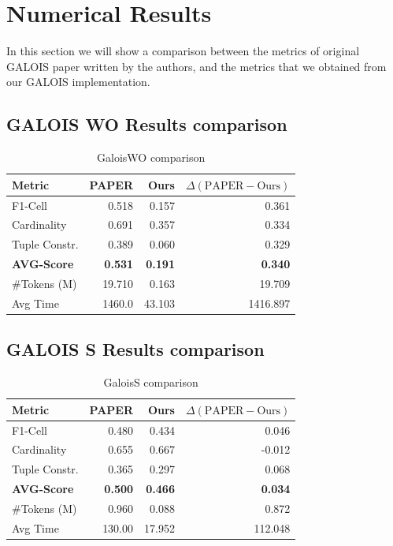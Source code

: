 \section{Numerical Results}
\label{results_galois}
In this section we will show a comparison between the metrics of original GALOIS paper written by the authors, and the metrics that we obtained from our GALOIS implementation.

\subsection{GALOIS WO Results comparison}

\begin{table}[H] %
\centering
\begin{tabular}{lrrr}
\hline
Metric & PAPER & Ours & $\Delta(\text{PAPER} - \text{Ours})$ \\
\hline
F1-Cell       & 0.518 & 0.157 & 0.361 \\
Cardinality   & 0.691 & 0.357 & 0.334 \\
Tuple Constr. & 0.389 & 0.060 & 0.329 \\
\textbf{AVG-Score} & \textbf{0.531} & \textbf{0.191} & \textbf{0.340} \\
\#Tokens (M)  & 19.710 &  0.163    &  19.709     \\
Avg Time      & 1460.0 &  43.103    &   1416.897    \\
\hline
\end{tabular}
\caption{GaloisWO comparison}
\label{galoisWO_results}
\end{table}

\subsection{GALOIS S Results comparison}

\begin{table}[H]
\centering
\begin{tabular}{lrrr}
\hline
Metric & PAPER & Ours & $\Delta(\text{PAPER} - \text{Ours})$ \\
\hline
F1-Cell       & 0.480 & 0.434 & 0.046 \\
Cardinality   & 0.655 & 0.667 & -0.012 \\
Tuple Constr. & 0.365 & 0.297 & 0.068 \\
\textbf{AVG-Score} & \textbf{0.500} & \textbf{0.466} & \textbf{0.034} \\
\#Tokens (M)  & 0.960 &  0.088    &   0.872    \\
Avg Time      & 130.00 &  17.952   &   112.048    \\
\hline
\end{tabular}
\caption{GaloisS comparison}
\label{galoiss_results}
\end{table}

